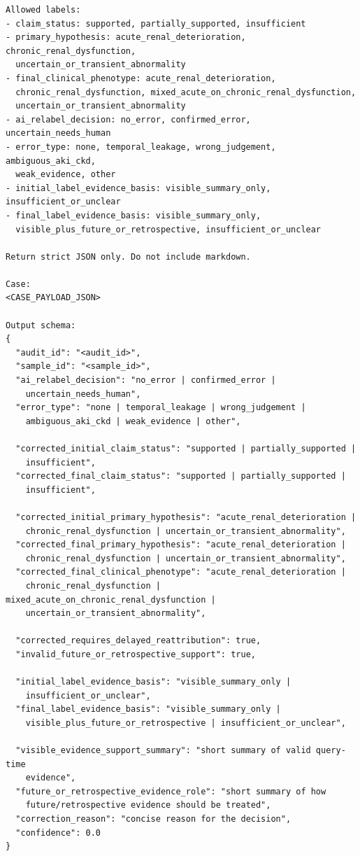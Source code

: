 \begin{verbatim}
Allowed labels:
- claim_status: supported, partially_supported, insufficient
- primary_hypothesis: acute_renal_deterioration, chronic_renal_dysfunction,
  uncertain_or_transient_abnormality
- final_clinical_phenotype: acute_renal_deterioration,
  chronic_renal_dysfunction, mixed_acute_on_chronic_renal_dysfunction,
  uncertain_or_transient_abnormality
- ai_relabel_decision: no_error, confirmed_error, uncertain_needs_human
- error_type: none, temporal_leakage, wrong_judgement, ambiguous_aki_ckd,
  weak_evidence, other
- initial_label_evidence_basis: visible_summary_only, insufficient_or_unclear
- final_label_evidence_basis: visible_summary_only,
  visible_plus_future_or_retrospective, insufficient_or_unclear

Return strict JSON only. Do not include markdown.

Case:
<CASE_PAYLOAD_JSON>

Output schema:
{
  "audit_id": "<audit_id>",
  "sample_id": "<sample_id>",
  "ai_relabel_decision": "no_error | confirmed_error |
    uncertain_needs_human",
  "error_type": "none | temporal_leakage | wrong_judgement |
    ambiguous_aki_ckd | weak_evidence | other",

  "corrected_initial_claim_status": "supported | partially_supported |
    insufficient",
  "corrected_final_claim_status": "supported | partially_supported |
    insufficient",

  "corrected_initial_primary_hypothesis": "acute_renal_deterioration |
    chronic_renal_dysfunction | uncertain_or_transient_abnormality",
  "corrected_final_primary_hypothesis": "acute_renal_deterioration |
    chronic_renal_dysfunction | uncertain_or_transient_abnormality",
  "corrected_final_clinical_phenotype": "acute_renal_deterioration |
    chronic_renal_dysfunction | mixed_acute_on_chronic_renal_dysfunction |
    uncertain_or_transient_abnormality",

  "corrected_requires_delayed_reattribution": true,
  "invalid_future_or_retrospective_support": true,

  "initial_label_evidence_basis": "visible_summary_only |
    insufficient_or_unclear",
  "final_label_evidence_basis": "visible_summary_only |
    visible_plus_future_or_retrospective | insufficient_or_unclear",

  "visible_evidence_support_summary": "short summary of valid query-time
    evidence",
  "future_or_retrospective_evidence_role": "short summary of how
    future/retrospective evidence should be treated",
  "correction_reason": "concise reason for the decision",
  "confidence": 0.0
}
\end{verbatim}

